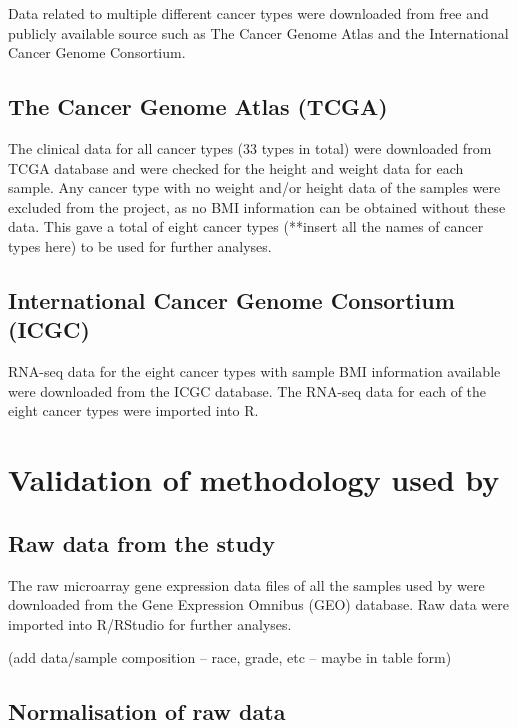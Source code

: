 Data related to multiple different cancer types were downloaded from free and publicly available source such as The Cancer Genome Atlas and the International Cancer Genome Consortium.

\subsection{The Cancer Genome Atlas (TCGA)}
\label{subsec:tcga}

The clinical data for all cancer types (33 types in total) were downloaded from TCGA database and were checked for the height and weight data for each sample.
Any cancer type with no weight and/or height data of the samples were excluded from the project, as no BMI information can be obtained without these data.
This gave a total of eight cancer types (**insert all the names of cancer types here) to be used for further analyses.

\subsection{International Cancer Genome Consortium (ICGC)}
\label{subsec:icgc}

RNA-seq data for the eight cancer types with sample BMI information available were downloaded from the ICGC database.
The RNA-seq data for each of the eight cancer types were imported into R.

\section{Validation of methodology used by \citet{Creighton2012}}
\label{sec:methodvalidation}

\subsection{Raw data from the \citet{Creighton2012} study}
\label{subsec:rawdatacr}

The raw microarray gene expression data files of all the samples used by \citet{Creighton2012} were downloaded from the Gene Expression Omnibus (GEO) database.
Raw data were imported into R/RStudio for further analyses.

(add data/sample composition -- race, grade, etc -- maybe in table form)

\subsection{Normalisation of raw \citet{Creighton2012} data}
\label{subsec:normcrdata}

